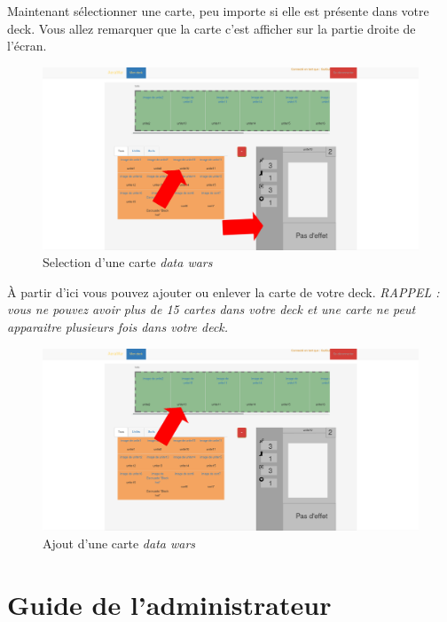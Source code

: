 \documentclass[a4paper,11pt]{report}
\begin{document}
	Maintenant sélectionner une carte, peu importe si elle est présente dans votre deck. 	Vous allez remarquer que la carte c'est afficher sur la partie droite de l'écran.

	\begin{figure}[th]
		\begin{center}
		\includegraphics[scale=0.4]{Assets/carte_deck.png}
      		\caption{Selection d'une carte \textit{data wars}}
      		\label{fig2}
     		\end{center}
	\end{figure}

	À partir d'ici vous pouvez ajouter ou enlever la carte de votre deck.
\textit{RAPPEL : vous ne pouvez avoir plus de 15 cartes dans votre deck et une carte ne peut apparaitre plusieurs fois dans votre deck.}

	\begin{figure}[th]
		\begin{center}
		\includegraphics[scale=0.4]{Assets/add_deck.png}
      		\caption{Ajout d'une carte \textit{data wars}}
      		\label{fig2}
     		\end{center}
	\end{figure}

\chapter{Guide de l'administrateur}
\end{document}
